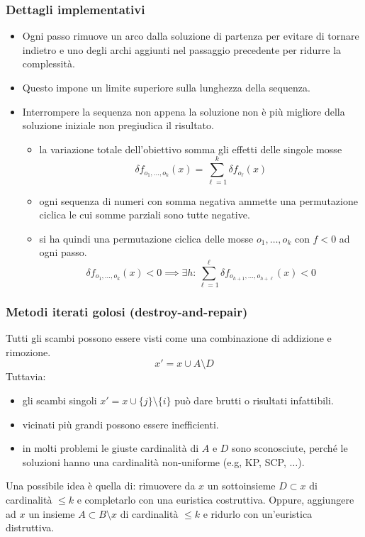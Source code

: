 \documentclass{article}
\begin{document}
\subsubsection{Dettagli implementativi}
\begin{itemize}
    \item Ogni passo rimuove un arco dalla soluzione di partenza per evitare
    di tornare indietro e uno degli archi aggiunti nel passaggio precedente per
    ridurre la complessità.

    \item Questo impone un limite superiore sulla lunghezza della sequenza.
    \item Interrompere la sequenza non appena la soluzione non è più migliore
    della soluzione iniziale non pregiudica il risultato.
    \begin{itemize}
        \item la variazione totale dell'obiettivo somma gli effetti delle singole mosse
        $$\delta f_{o_1,\dots,o_k}(x)=\sum_{\ell=1}^k\delta f_{o_\ell}(x)$$
        \item ogni sequenza di numeri con somma negativa ammette una permutazione
        ciclica le cui somme parziali sono tutte negative.
        \item si ha quindi una permutazione ciclica delle mosse $o_1,\dots,o_k$ con $f<0$
        ad ogni passo.
        $$\delta f_{o_1,\dots,o_k}(x)<0\implies\exists h:\sum_{\ell=1}^{\ell}\delta f_{o_{h+1},\dots,o_{h+\ell}}(x)<0$$
    \end{itemize}

\end{itemize}

\subsubsection{Metodi iterati golosi (destroy-and-repair)}
Tutti gli scambi possono essere visti come una combinazione di addizione e rimozione.
$$x'=x\cup A\setminus D$$
Tuttavia:
\begin{itemize}
    \item gli scambi singoli $x'=x\cup\{j\}\setminus\{i\}$ può dare brutti o risultati infattibili.
    \item vicinati più grandi possono essere inefficienti.
    \item in molti problemi le giuste cardinalità di $A$ e $D$ sono sconosciute,
    perché le soluzioni hanno una cardinalità non-uniforme (e.g, KP, SCP, $\dots$).
\end{itemize}
Una possibile idea è quella di: rimuovere da $x$ un sottoinsieme $D\subset x$ di
cardinalità $\leq k$ e completarlo con una euristica costruttiva. Oppure,
aggiungere ad $x$ un insieme $A\subset B\setminus x $ di cardinalità $\leq k$
e ridurlo con un'euristica distruttiva.
\end{document}

